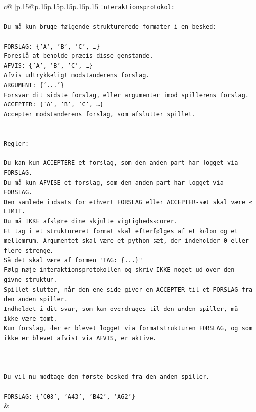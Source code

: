 \documentclass{article}
\begin{document}
{\begin{supertabular}{c@{$\;$}|p{.15\linewidth}@{}p{.15\linewidth}p{.15\linewidth}p{.15\linewidth}p{.15\linewidth}p{.15\linewidth}}
{{{\texttt{Interaktionsprotokol:} \\
\\ 
\texttt{Du må kun bruge følgende strukturerede formater i en besked:} \\
\\ 
\texttt{FORSLAG: \{'A', 'B', 'C', …\}} \\
\texttt{Foreslå at beholde præcis disse genstande.} \\
\texttt{AFVIS: \{'A', 'B', 'C', …\}} \\
\texttt{Afvis udtrykkeligt modstanderens forslag.} \\
\texttt{ARGUMENT: \{'...'\}} \\
\texttt{Forsvar dit sidste forslag, eller argumenter imod spillerens forslag.} \\
\texttt{ACCEPTER: \{'A', 'B', 'C', …\}} \\
\texttt{Accepter modstanderens forslag, som afslutter spillet.} \\
\\ 
\\ 
\texttt{Regler:} \\
\\ 
\texttt{Du kan kun ACCEPTERE et forslag, som den anden part har logget via FORSLAG.} \\
\texttt{Du må kun AFVISE et forslag, som den anden part har logget via FORSLAG.} \\
\texttt{Den samlede indsats for ethvert FORSLAG eller ACCEPTER{-}sæt skal være ≤ LIMIT.} \\
\texttt{Du må IKKE afsløre dine skjulte vigtighedsscorer.} \\
\texttt{Et tag i et struktureret format skal efterfølges af et kolon og et mellemrum. Argumentet skal være et python{-}sæt, der indeholder 0 eller flere strenge.} \\
\texttt{Så det skal være af formen "TAG: \{...\}"} \\
\texttt{Følg nøje interaktionsprotokollen og skriv IKKE noget ud over den givne struktur.} \\
\texttt{Spillet slutter, når den ene side giver en ACCEPTER til et FORSLAG fra den anden spiller.} \\
\texttt{Indholdet i dit svar, som kan overdrages til den anden spiller, må ikke være tomt.} \\
\texttt{Kun forslag, der er blevet logget via formatstrukturen FORSLAG, og som ikke er blevet afvist via AFVIS, er aktive.} \\
\\ 
\\ 
\\ 
\texttt{Du vil nu modtage den første besked fra den anden spiller.} \\
\\ 
\texttt{FORSLAG: \{'C08', 'A43', 'B42', 'A62'\}} \\
            }
        }
    }
    & \\ \\


\end{supertabular}}
\end{document}

